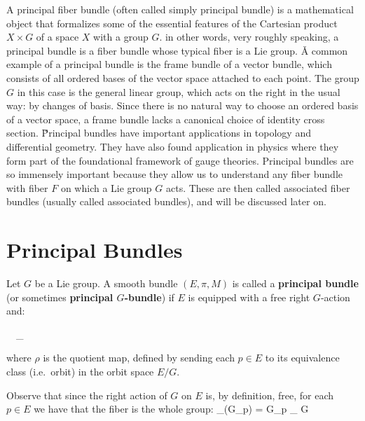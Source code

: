 A principal fiber bundle (often called simply principal bundle) is a mathematical object that formalizes some of the
essential features of the Cartesian product $X \times G$ of a space $X$ with a group $G$. in other words, very
roughly speaking, a principal bundle is a fiber bundle whose typical fiber is a Lie group. \v

A common example of a principal bundle is the frame bundle of a vector bundle, which consists of all ordered bases of
the vector space attached to each point. The group $G$ in this case is the general linear group, which acts on the
right in the usual way: by changes of basis. Since there is no natural way to choose an ordered basis of a vector
space, a frame bundle lacks a canonical choice of identity cross section. \v

Principal bundles have important applications in topology and differential geometry. They have also found application
in physics where they form part of the foundational framework of gauge theories. Principal bundles are so immensely
important because they allow us to understand any fiber bundle with fiber $F$ on which a Lie group $G$ acts. These
are then called associated fiber bundles (usually called associated bundles), and will be discussed later on.

\section{Principal Bundles}

Let $G$ be a Lie group. A smooth bundle $(E,\pi,M)$ is called a \textbf{principal bundle} (or sometimes
\textbf{principal $G$-bundle}) if $E$ is equipped with a free right $G$-action and:
\bse
{} \ \ \cong_{}
\ese

where $\rho$ is the quotient map, defined by sending each $p\in E$ to its equivalence class (i.e.\ orbit) in the
orbit space $E/G$.
\ed

Observe that since the right action of $G$ on $E$ is, by definition, free, for each $p\in E$ we have that the fiber
is the whole group:
\bse
\preim_\rho(G_p) = G_p \cong_{} G
\ese

